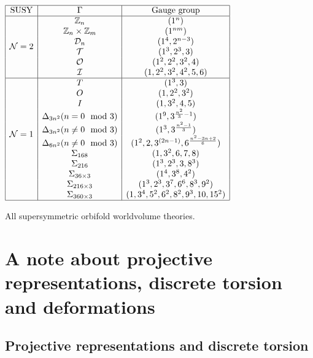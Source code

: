     \begin{table}[H]
        \centering
        $
        \begin{array}{|c|c|c|}
            \hline
            \text{SUSY} & \Gamma & \text{Gauge group} \\ \hline
            \multirow{6}{*}{$\mN=2$} & \Z_{n} & (1^n) \\
            & \Z_{n}\times\Z_m & (1^{nm}) \\
            & \D_{n} & (1^4,2^{n-3}) \\
            & \mathcal{T} & (1^3,2^3,3) \\
            & \mathcal{O} & (1^2,2^2,3^2,4) \\
            & \mathcal{I} & (1,2^2,3^2,4^2,5,6) \\ \hline
            \multirow{11}{*}{$\mN=1$} & T & (1^3,3) \\
            & O & (1,2^2,3^2) \\
            & I & (1,3^2,4,5) \\
            & \Delta_{3n^2} (n=0\mod 3) & (1^9,3^{\frac{n^2}{3}-1}) \\
            & \Delta_{3n^2} (n\neq0\mod 3) & (1^3,3^{\frac{n^2-1}{3}}) \\
            & \Delta_{6n^2} (n\neq0\mod 3) & (1^2,2,3^{(2n-1)},6^{\frac{n^2-3n+2}{6}}) \\
            & \Sigma_{168} & (1,3^2,6,7,8) \\
            & \Sigma_{216} & (1^3,2^3,3,8^3) \\
            & \Sigma_{36\times 3} & (1^4,3^8,4^2) \\
            & \Sigma_{216\times 3} & (1^3,2^3,3^7,6^6,8^3,9^2) \\
            & \Sigma_{360\times 3} & (1,3^4,5^2,6^2,8^2,9^3,10,15^2) \\ \hline
        \end{array}
        $
        \caption{All supersymmetric orbifold worldvolume theories.}
    \end{table}

\section{A note about projective representations, discrete torsion and deformations}

    \subsection{Projective representations and discrete torsion}

